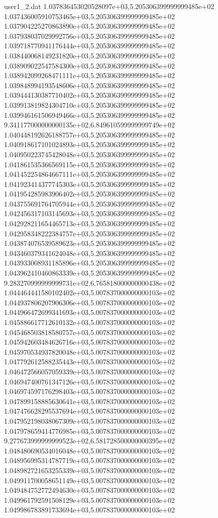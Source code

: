 \begin{filecontents}{user1_2.dat}
1.037836453020528097e+03,5.205306399999999485e+02
1.037436005910753465e+03,5.205306399999999485e+02
1.037904225270863890e+03,5.205306399999999485e+02
1.037938037029992756e+03,5.205306399999999485e+02
1.039718770941176444e+03,5.205306399999999485e+02
1.038440068149231820e+03,5.205306399999999485e+02
1.038909022547584300e+03,5.205306399999999485e+02
1.038942099268471111e+03,5.205306399999999485e+02
1.039848994193548606e+03,5.205306399999999485e+02
1.039444130387710402e+03,5.205306399999999485e+02
1.039913819824304710e+03,5.205306399999999485e+02
1.039946161506949466e+03,5.205306399999999485e+02
9.341177000000000135e+02,6.849610599999999749e+02
1.040448192626188757e+03,5.205306399999999485e+02
1.040918617101024893e+03,5.205306399999999485e+02
1.040950223745428048e+03,5.205306399999999485e+02
1.041861535366569115e+03,5.205306399999999485e+02
1.041452254864667111e+03,5.205306399999999485e+02
1.041923414377745303e+03,5.205306399999999485e+02
1.041954285983906402e+03,5.205306399999999485e+02
1.043755691764705944e+03,5.205306399999999485e+02
1.042456317103145693e+03,5.205306399999999485e+02
1.042928211654465713e+03,5.205306399999999485e+02
1.042958348222384757e+03,5.205306399999999485e+02
1.043874076539589623e+03,5.205306399999999485e+02
1.043460379341624048e+03,5.205306399999999485e+02
1.043933008931185896e+03,5.205306399999999485e+02
1.043962410460863339e+03,5.205306399999999485e+02
9.283270999999999731e+02,6.765818000000000438e+02
1.044464441580102402e+03,5.007837000000000103e+02
1.044937806207906306e+03,5.007837000000000103e+02
1.044966472699341693e+03,5.007837000000000103e+02
1.045886617712610132e+03,5.007837000000000103e+02
1.045468503818580757e+03,5.007837000000000103e+02
1.045942603484626716e+03,5.007837000000000103e+02
1.045970534937820048e+03,5.007837000000000103e+02
1.047792612588235443e+03,5.007837000000000103e+02
1.046472566057059339e+03,5.007837000000000103e+02
1.046947400761347126e+03,5.007837000000000103e+02
1.046974597176298403e+03,5.007837000000000103e+02
1.047899158885630641e+03,5.007837000000000103e+02
1.047476628295537694e+03,5.007837000000000103e+02
1.047952198038067309e+03,5.007837000000000103e+02
1.047978659414776985e+03,5.007837000000000103e+02
9.277673999999999523e+02,6.581728500000000395e+02
1.048480690534016048e+03,5.007837000000000103e+02
1.048956995314787719e+03,5.007837000000000103e+02
1.048982721653255339e+03,5.007837000000000103e+02
1.049911700058651149e+03,5.007837000000000103e+02
1.049484752772494630e+03,5.007837000000000103e+02
1.049961792591508129e+03,5.007837000000000103e+02
1.049986783891733694e+03,5.007837000000000103e+02

\end{filecontents}
